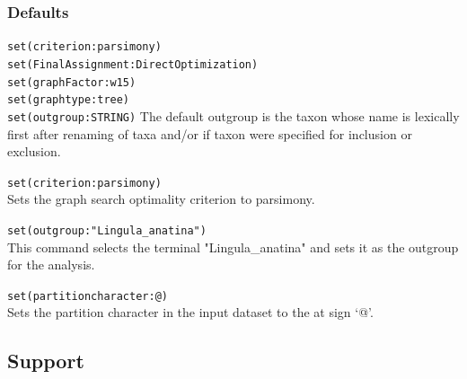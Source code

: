	\subsubsection{Defaults} 
		\texttt{set(criterion:parsimony)}\\
		\texttt{set(FinalAssignment:DirectOptimization)} \\
		\texttt{set(graphFactor:w15)} \\
		\texttt{set(graphtype:tree)}\\
		\texttt{set(outgroup:STRING)} The default outgroup is the taxon whose name is 
		lexically first after renaming of taxa and/or if taxon were specified for inclusion or
		exclusion. 
		
		
	\begin{example}
	
		\item{\texttt{set(criterion:parsimony)}\\Sets the graph search optimality criterion to 
		parsimony.}

		\item{\texttt{set(outgroup:"Lingula\_anatina")}\\This command selects the terminal 
		"Lingula\_anatina" and sets it as the outgroup for the analysis.}
		
		\item{\texttt{set(partitioncharacter:@)}\\Sets the partition character in the input dataset 
		to the at sign `@'.}
		

	\end{example}

\subsection{Support}
\label{subsec:support}
